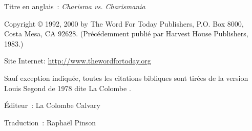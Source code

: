 \newpage
\mbox{}
\vfill
\noindent Titre en anglais~: \emph{Charisma vs. Charismania}

\noindent Copyright \copyright{} 1992, 2000 by The Word For Today Publishers, P.O. Box 8000, \\
Costa Mesa, CA 92628. (Précédemment publié par Harvest House Publishers, 1983.) \\


\noindent \ccbyncnd

\noindent Site Internet: \url{http://www.thewordfortoday.org}

\noindent Sauf exception indiquée, toutes les citations bibliques sont
 tirées de la version Louis Segond de 1978 dite \og La Colombe \fg{}.

\noindent Éditeur~: La Colombe Calvary

\noindent Traduction~: Raphaël Pinson

